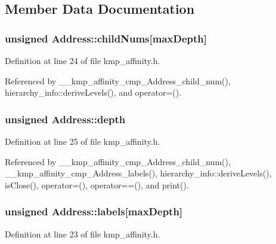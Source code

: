 \subsection{Member Data Documentation}
\hypertarget{classAddress_aae88cf413f1d90429d34a23387a8fe81}{
\subsubsection[{child\-Nums}]{\setlength{\rightskip}{0pt plus 5cm}unsigned Address\-::child\-Nums\mbox{[}{\bf max\-Depth}\mbox{]}}}\label{classAddress_aae88cf413f1d90429d34a23387a8fe81}


Definition at line 24 of file kmp\-\_\-affinity.\-h.



Referenced by \-\_\-\-\_\-kmp\-\_\-affinity\-\_\-cmp\-\_\-\-Address\-\_\-child\-\_\-num(), hierarchy\-\_\-info\-::derive\-Levels(), and operator=().

\hypertarget{classAddress_a1adef13df4b328813a1bf4b92c56ee10}{
\subsubsection[{depth}]{\setlength{\rightskip}{0pt plus 5cm}unsigned Address\-::depth}}\label{classAddress_a1adef13df4b328813a1bf4b92c56ee10}


Definition at line 25 of file kmp\-\_\-affinity.\-h.



Referenced by \-\_\-\-\_\-kmp\-\_\-affinity\-\_\-cmp\-\_\-\-Address\-\_\-child\-\_\-num(), \-\_\-\-\_\-kmp\-\_\-affinity\-\_\-cmp\-\_\-\-Address\-\_\-labels(), hierarchy\-\_\-info\-::derive\-Levels(), is\-Close(), operator=(), operator==(), and print().

\hypertarget{classAddress_a0a5fc0038932317cd8f46d802850996a}{
\subsubsection[{labels}]{\setlength{\rightskip}{0pt plus 5cm}unsigned Address\-::labels\mbox{[}{\bf max\-Depth}\mbox{]}}}\label{classAddress_a0a5fc0038932317cd8f46d802850996a}


Definition at line 23 of file kmp\-\_\-affinity.\-h.



